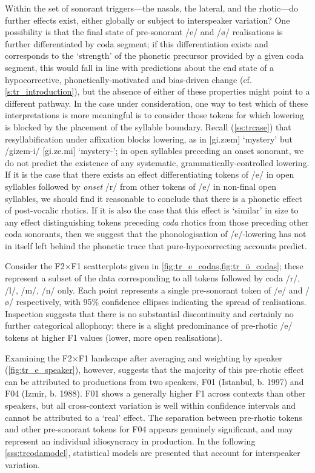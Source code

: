 Within the set of sonorant triggers---the nasals, the lateral, and the rhotic---do further effects exist, either globally or subject to interspeaker variation? One possibility is that the final state of pre-sonorant /e/ and /\o/ realisations is further differentiated by coda segment; if this differentiation exists and corresponds to the `strength' of the phonetic precursor provided by a given coda segment, this would fall in line with predictions about the end state of a hypocorrective, phonetically-motivated and bias-driven change (cf. \cref{s:tr_introduction}), but the absence of either of these properties might point to a different pathway. In the case under consideration, one way to test which of these interpretations is more meaningful is to consider those tokens for which lowering is blocked by the placement of the syllable boundary. Recall (\cref{ss:trcase}) that resyllabification under affixation blocks lowering, as in [gi.zæm] `mystery' but /gizem-i/ [gi.ze.mi] `mystery-'; in open syllables preceding an onset sonorant, we do not predict the existence of any systematic, grammatically-controlled lowering. If it is the case that there exists an effect differentiating tokens of /e/ in open syllables followed by \emph{onset} /r/ from other tokens of /e/ in non-final open syllables, we should find it reasonable to conclude that there is a phonetic effect of post-vocalic rhotics. If it is also the case that this effect is `similar' in size to any effect distinguishing tokens preceding \emph{coda} rhotics from those preceding other coda sonorants, then we suggest that the phonologisation of /e/-lowering has not in itself left behind the phonetic trace that pure-hypocorrecting accounts predict.

Consider the F2$\times$F1 scatterplots given in \cref{fig:tr_e_codas,fig:tr_ö_codas}; these represent a subset of the data corresponding to all tokens followed by coda /r/, /l/, /m/, /n/ only. Each point represents a single pre-sonorant token of /e/ and /\o/ respectively, with 95\% confidence ellipses indicating the spread of realisations. Inspection suggests that there is no substantial discontinuity and certainly no further categorical allophony; there is a slight predominance of pre-rhotic /e/ tokens at higher F1 values (lower, more open realisations).

Examining the F2$\times$F1 landscape after averaging and weighting by speaker (\cref{fig:tr_e_speaker}), however, suggests that the majority of this pre-rhotic effect can be attributed to productions from two speakers, F01 (Istanbul, b. 1997) and F04 (Izmir, b. 1988). F01 shows a generally higher F1 across contexts than other speakers, but all cross-context variation is well within confidence intervals and cannot be attributed to a `real' effect. The separation between pre-rhotic tokens and other pre-sonorant tokens for F04 appears genuinely significant, and may represent an individual idiosyncracy in production. In the following \cref{sss:trcodamodel}, statistical models are presented that account for interspeaker variation.

